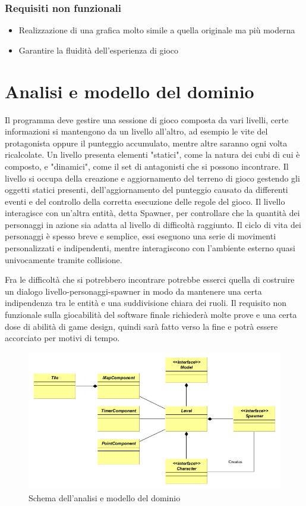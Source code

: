 \documentclass[a4paper,12pt]{report}
\begin{document}
\subsubsection{Requisiti non funzionali}
\begin{itemize}
	\item Realizzazione di una grafica molto simile a quella originale ma più moderna
	\item Garantire la fluidità dell’esperienza di gioco

\end{itemize}

\section{Analisi e modello del dominio}

Il programma deve gestire una sessione di gioco composta da vari livelli, certe informazioni si mantengono da un livello all'altro, ad esempio le vite del protagonista oppure il punteggio accumulato, mentre altre saranno ogni volta ricalcolate. Un livello presenta elementi "statici", come la natura dei cubi di cui è composto, e "dinamici", come il set di antagonisti che si possono incontrare. Il livello si occupa della creazione e aggiornamento del terreno di gioco gestendo gli oggetti statici presenti,  dell'aggiornamento del punteggio causato da differenti eventi e del controllo della corretta esecuzione delle regole del gioco. Il livello interagisce con un'altra entità, detta Spawner, per controllare che la quantità dei personaggi in azione sia adatta al livello di difficoltà raggiunto. Il ciclo di vita dei personaggi è spesso breve e semplice, essi eseguono una serie di movimenti personalizzati e indipendenti, mentre interagiscono con l'ambiente esterno quasi univocamente tramite collisione.

Fra le difficoltà che si potrebbero incontrare potrebbe esserci quella di costruire un dialogo livello-personaggi-spawner in modo da mantenere una certa indipendenza tra le entità e una suddivisione chiara dei ruoli. Il requisito non funzionale sulla giocabilità del software finale richiederà molte prove e una certa dose di abilità di game design, quindi sarà fatto verso la fine e potrà essere accorciato per motivi di tempo.

\begin{figure}[H]
\centering{}
\includegraphics[width=\linewidth]{img/Analisi}
\caption{Schema dell'analisi e modello del dominio}
\label{img:Analysis}
\end{figure}
\end{document}
